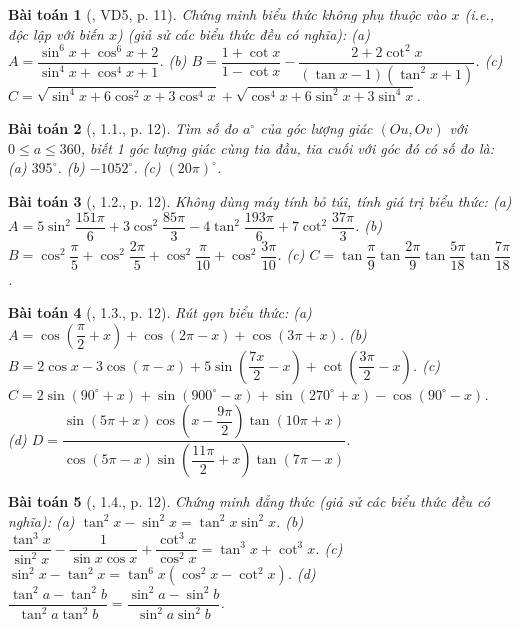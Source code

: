 \documentclass{article}
\newtheorem{baitoan}{Bài toán}
\begin{document}
\begin{baitoan}[\cite{Hung_nang_cao_phat_trien_Toan_11_tap_1}, VD5, p. 11]
	Chứng minh biểu thức không phụ thuộc vào $x$ (i.e., độc lập với biến $x$) (giả sử các biểu thức đều có nghĩa): (a) $A = \dfrac{\sin^6x + \cos^6x + 2}{\sin^4x + \cos^4x + 1}$. (b) $B = \dfrac{1 + \cot x}{1 - \cot x} - \dfrac{2 + 2\cot^2x}{(\tan x - 1)(\tan^2x + 1)}$. (c) $C = \sqrt{\sin^4x + 6\cos^2x + 3\cos^4x} + \sqrt{\cos^4x + 6\sin^2x + 3\sin^4x}$.
\end{baitoan}

\begin{baitoan}[\cite{Hung_nang_cao_phat_trien_Toan_11_tap_1}, 1.1., p. 12]
	Tìm số đo $a^\circ$ của góc lượng giác $(Ou,Ov)$ với $0\le a\le360$, biết 1 góc lượng giác cùng tia đầu, tia cuối với góc đó có số đo là: (a) $395^\circ$. (b) $-1052^\circ$. (c) $(20\pi)^\circ$.
\end{baitoan}

\begin{baitoan}[\cite{Hung_nang_cao_phat_trien_Toan_11_tap_1}, 1.2., p. 12]
	Không dùng máy tính bỏ túi, tính giá trị biểu thức: (a) $A = 5\sin^2\dfrac{151\pi}{6} + 3\cos^2\dfrac{85\pi}{3} - 4\tan^2\dfrac{193\pi}{6} + 7\cot^2\dfrac{37\pi}{3}$. (b) $B = \cos^2\dfrac{\pi}{5} + \cos^2\dfrac{2\pi}{5} + \cos^2\dfrac{\pi}{10} + \cos^2\dfrac{3\pi}{10}$. (c) $C = \tan\dfrac{\pi}{9}\tan\dfrac{2\pi}{9}\tan\dfrac{5\pi}{18}\tan\dfrac{7\pi}{18}$.
\end{baitoan}

\begin{baitoan}[\cite{Hung_nang_cao_phat_trien_Toan_11_tap_1}, 1.3., p. 12]
	Rút gọn biểu thức: (a) $A = \cos\left(\dfrac{\pi}{2} + x\right) + \cos(2\pi - x) + \cos(3\pi + x)$. (b) $B = 2\cos x - 3\cos(\pi - x) + 5\sin\left(\dfrac{7x}{2} - x\right) + \cot\left(\dfrac{3\pi}{2} - x\right)$. (c) $C = 2\sin(90^\circ + x) + \sin(900^\circ - x) + \sin(270^\circ + x) - \cos(90^\circ - x)$. (d) $D = \dfrac{\sin(5\pi + x)\cos\left(x - \dfrac{9\pi}{2}\right)\tan(10\pi + x)}{\cos(5\pi - x)\sin\left(\dfrac{11\pi}{2} + x\right)\tan(7\pi - x)}$.
\end{baitoan}

\begin{baitoan}[\cite{Hung_nang_cao_phat_trien_Toan_11_tap_1}, 1.4., p. 12]
	Chứng minh đẳng thức (giả sử các biểu thức đều có nghĩa): (a) $\tan^2x - \sin^2x = \tan^2x\sin^2x$. (b) $\dfrac{\tan^3x}{\sin^2x} - \dfrac{1}{\sin x\cos x} + \dfrac{\cot^3x}{\cos^2x} = \tan^3x + \cot^3x$. (c) $\sin^2x - \tan^2x = \tan^6x(\cos^2x - \cot^2x)$. (d) $\dfrac{\tan^2a - \tan^2b}{\tan^2a\tan^2b} = \dfrac{\sin^2a - \sin^2b}{\sin^2a\sin^2b}$.
\end{baitoan}
\end{document}
